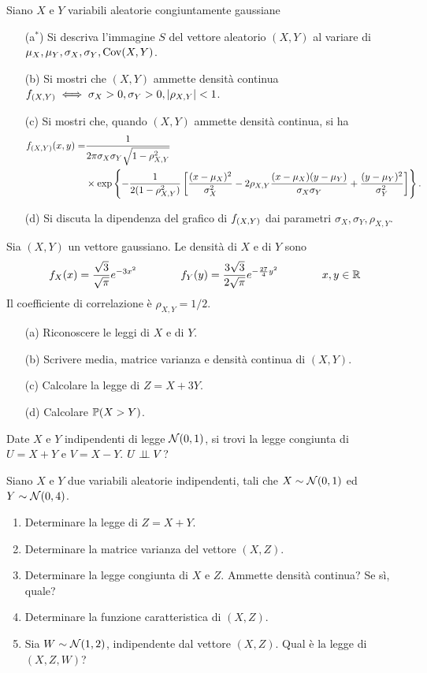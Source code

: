 \Esercizio{} %
Siano $X$ e $Y$ variabili aleatorie congiuntamente gaussiane
\begin{enumerate}
\item [(a$^*$)] Si descriva l'immagine $S$ del vettore aleatorio $(X,Y)$ al variare di $\mu_X,\mu_Y,\sigma_X,\sigma_Y, \operatorname{Cov}(X,Y)$.
\item [(b)] Si mostri che $(X,Y)$ ammette densità continua $f_{(X,Y)}\iff\sigma_X>0,\sigma_Y>0,|\rho_{X,Y}|<1$.
\item [(c)] Si mostri che, quando $(X,Y)$ ammette densità continua, si ha
\begin{gather*}
\begin{aligned}
f_{(X,Y)}(x,y)=&\frac{1}{2\pi\sigma_X\sigma_Y\sqrt{1-\rho_{X,Y}^2}}\\ &\times\exp\left\{-\frac{1}{2(1-\rho_{X,Y}^2)}\left[\frac{(x-\mu_X)^2}{\sigma_X^2}-2\rho_{X,Y}\frac{(x-\mu_X)(y-\mu_Y)}{\sigma_X\sigma_Y}+\frac{(y-\mu_Y)^2}{\sigma_Y^2}  \right]\right\}.
\end{aligned}
\end{gather*}
\item [(d)] Si discuta la dipendenza del grafico di $f_{(X,Y)}$ dai parametri $\sigma_X,\sigma_Y,\rho_{X,Y}$.
\end{enumerate}

\Esercizio{} %
Sia $(X,Y)$ un vettore gaussiano. Le densità di $X$ e di $Y$ sono
\[
f_X(x)=\frac{\sqrt{3}}{\sqrt{\pi}}e^{-3x^2}\qquad\qquad f_Y(y)=\frac{3\sqrt{3}}{2\sqrt{\pi}}e^{-\frac{27}{4}y^2}\qquad\qquad x,y\in\mathbb{R}
\]
Il coefficiente di correlazione è $\rho_{X,Y}=1/2$.
\begin{enumerate}
\item [(a)] Riconoscere le leggi di $X$ e di $Y$.
\item [(b)] Scrivere media, matrice varianza e densità continua di $(X,Y)$.
\item [(c)] Calcolare la legge di $Z=X+3Y$.
\item [(d)] Calcolare $\mathbb{P}(X>Y)$.
\end{enumerate}

\Esercizio{} %
Date $X$ e $Y$ indipendenti di legge $\mathcal{N}(0,1)$, si trovi la legge congiunta di $U=X+Y$ e $V=X-Y$. $U\perp \!\!\! \perp V$?

\Esercizio{} %
Siano $X$ e $Y$ due variabili aleatorie indipendenti, tali che $X\sim\mathcal{N}(0,1)$ ed $Y\sim\mathcal{N}(0,4)$.
\begin{enumerate}
\item Determinare la legge di $Z=X+Y$.
\item Determinare la matrice varianza del vettore $(X,Z)$.
\item Determinare la legge congiunta di $X$ e $Z$. Ammette densità continua? Se sì, quale?
\item Determinare la funzione caratteristica di $(X,Z)$.
\item Sia $W\sim\mathcal{N}(1,2)$, indipendente dal vettore $(X,Z)$. Qual è la legge di $(X,Z,W)$?
\end{enumerate}

